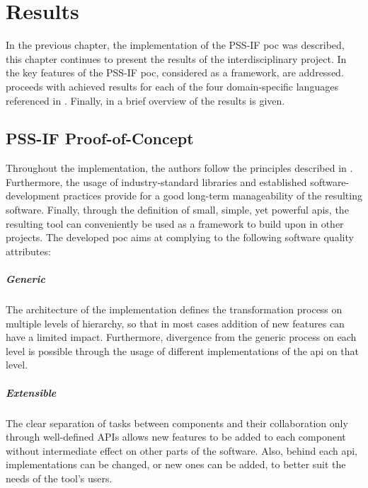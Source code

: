 \chapter{Results}
\label{chap:results}

In the previous chapter, the implementation of the PSS-IF \gls{poc} was described, this chapter continues to present the results of the interdisciplinary project. In  the key features of the PSS-IF \gls{poc}, considered as a framework, are addressed.  proceeds with achieved results for each of the four domain-specific languages referenced in . Finally, in  a brief overview of the results is given.

\section{PSS-IF Proof-of-Concept}
\label{sec:results:framework}

Throughout the implementation, the authors follow the principles described in . Furthermore, the usage of industry-standard libraries and established software-development practices provide for a good long-term manageability of the resulting software. Finally, through the definition of small, simple, yet powerful \glspl{api}, the resulting tool can conveniently be used as a framework to build upon in other projects. The developed \gls{poc} aims at complying to the following software quality attributes:

\paragraph{Generic} The architecture of the implementation defines the transformation process on multiple levels of hierarchy, so that in most cases addition of new features can have a limited impact. Furthermore, divergence from the generic process on each level is possible through the usage of different implementations of the \gls{api} on that level.

\paragraph{Extensible} The clear separation of tasks between components and their collaboration only through well-defined APIs allows new features to be added to each component without intermediate effect on other parts of the software. Also, behind each \gls{api}, implementations can be changed, or new ones can be added, to better suit the needs of the tool's users.

